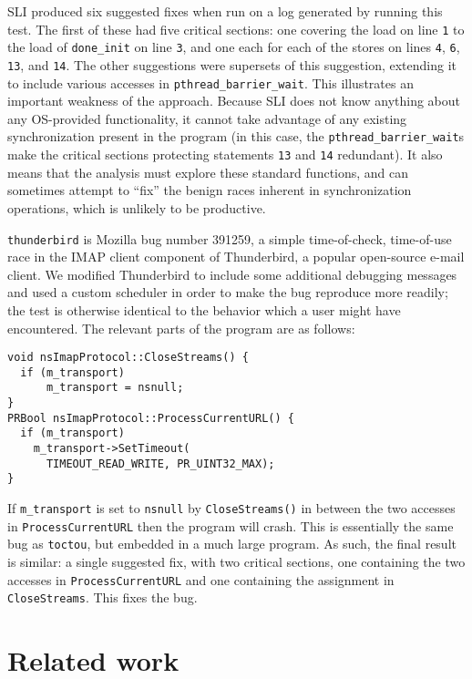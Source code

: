 \documentclass[10pt,twocolumn,preprint,natbib,authoryear]{sigplanconf}
\newcommand{\editorial}[1]{}
\begin{document}
SLI produced six suggested fixes when run on a log generated by
running this test.  The first of these had five critical sections: one
covering the load on line \verb|1| to the load of \verb|done_init| on
line \verb|3|, and one each for each of the stores on lines \verb|4|,
\verb|6|, \verb|13|, and \verb|14|.  The other suggestions were
supersets of this suggestion, extending it to include various accesses
in \verb|pthread_barrier_wait|.  This illustrates an important
weakness of the approach.  Because SLI does not know anything about
any OS-provided functionality, it cannot take advantage of any
existing synchronization present in the program (in this case, the
\verb|pthread_barrier_wait|s make the critical sections protecting
statements \verb|13| and \verb|14| redundant).  It also means that the
analysis must explore these standard functions, and can sometimes
attempt to ``fix'' the benign races inherent in synchronization
operations, which is unlikely to be productive.

\verb|thunderbird| is Mozilla bug number
391259\cite{thunderbird39125}, a simple time-of-check, time-of-use
race in the IMAP client component of Thunderbird, a popular
open-source e-mail client.  We modified Thunderbird to include some
additional debugging messages and used a custom scheduler in order to
make the bug reproduce more readily; the test is otherwise identical
to the behavior which a user might have encountered.  The relevant
parts of the program are as follows:

\begin{verbatim}
void nsImapProtocol::CloseStreams() {
  if (m_transport)
      m_transport = nsnull;
}
PRBool nsImapProtocol::ProcessCurrentURL() {
  if (m_transport)
    m_transport->SetTimeout(
      TIMEOUT_READ_WRITE, PR_UINT32_MAX);
}
\end{verbatim}

\noindent
If \verb|m_transport| is set to \verb|nsnull| by \verb|CloseStreams()|
in between the two accesses in \verb|ProcessCurrentURL| then the
program will crash.  This is essentially the same bug as
\verb|toctou|, but embedded in a much large program.  As such, the
final result is similar: a single suggested fix, with two critical
sections, one containing the two accesses in \verb|ProcessCurrentURL|
and one containing the assignment in \verb|CloseStreams|.  This fixes
the bug.

\section{Related work}\editorial{This is a bit of a bestiary.  Could do with a bit more analysis.}
\end{document}
